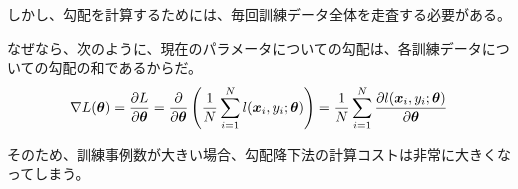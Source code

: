\documentclass[../../../topic_machine-learning]{subfiles}
\begin{document}
\br

しかし、勾配を計算するためには、毎回訓練データ全体を走査する必要がある。

なぜなら、次のように、現在のパラメータについての勾配は、各訓練データについての勾配の和であるからだ。
\begin{equation*}
  \nabla L(\vb*{\theta}) = \frac{\partial L}{\partial \vb*{\theta}} = \frac{\partial}{\partial \vb*{\theta}} \left( \frac{1}{N} \sum_{i=1}^{N} l(\vb*{x}_i, y_i; \vb*{\theta}) \right) = \frac{1}{N} \sum_{i=1}^{N} \frac{\partial l(\vb*{x}_i, y_i; \vb*{\theta})}{\partial \vb*{\theta}}
\end{equation*}

\br

そのため、訓練事例数が大きい場合、勾配降下法の計算コストは非常に大きくなってしまう。
\end{document}
